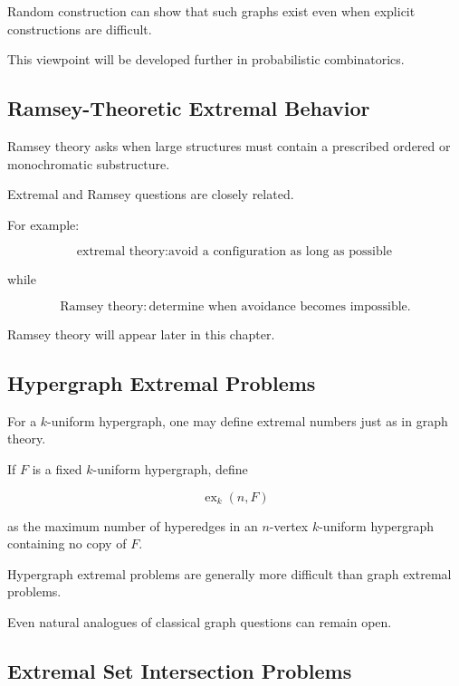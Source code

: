 Random construction can show that such graphs exist even when explicit
constructions are difficult.

This viewpoint will be developed further in probabilistic
combinatorics.

\subsection{Ramsey-Theoretic Extremal Behavior}
\label{subsec:ramsey-extremal-preview}

Ramsey theory asks when large structures must contain a prescribed
ordered or monochromatic substructure.

Extremal and Ramsey questions are closely related.

For example:

\[
\boxed{
\text{extremal theory}
:
\text{avoid a configuration as long as possible}
}
\]

while

\[
\boxed{
\text{Ramsey theory}
:
\text{determine when avoidance becomes impossible}.
}
\]

Ramsey theory will appear later in this chapter.

\subsection{Hypergraph Extremal Problems}
\label{subsec:hypergraph-extremal-problems}

For a \(k\)-uniform hypergraph, one may define extremal numbers just as
in graph theory.

If \(F\) is a fixed \(k\)-uniform hypergraph, define

\[
\boxed{
\operatorname{ex}_k(n,F)
}
\]

as the maximum number of hyperedges in an \(n\)-vertex \(k\)-uniform
hypergraph containing no copy of \(F\).

Hypergraph extremal problems are generally more difficult than graph
extremal problems.

Even natural analogues of classical graph questions can remain open.

\subsection{Extremal Set Intersection Problems}
\label{subsec:extremal-intersection-problems}

